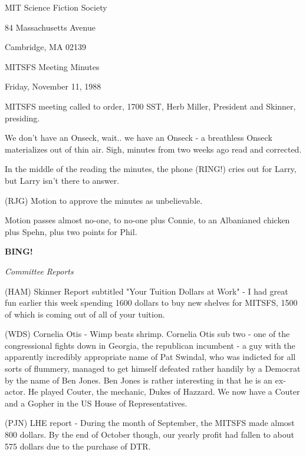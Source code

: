 \documentclass[12pt]{article}
\newcommand{\bing}{{\bf BING!} }
\newcommand{\goto}[1]{\bing \vskip 12pt \centerline{{\em{#1}}}}
\begin{document}
\begin{center}

MIT Science Fiction Society 

84 Massachusetts Avenue

Cambridge, MA 02139

\vspace{12pt}

MITSFS Meeting Minutes 

Friday, November 11, 1988

\end{center}
 
\vspace{18pt}

\setlength{\parskip}{6pt}

\noindent
MITSFS meeting called to order, 1700 SST, Herb Miller, President and Skinner, presiding.

We don't have an Onseck, wait.. we have an Onseck - a breathless Onseck materializes out of thin air. Sigh, minutes from two weeks ago read and corrected.

In the middle of the reading the minutes, the phone (RING!) cries out for Larry, but Larry isn't there to answer.

(RJG) Motion to approve the minutes as unbelievable.

Motion passes almost no-one, to no-one plus Connie, to an Albanianed chicken plus Spehn, plus two points for Phil.

\goto{Committee Reports}

(HAM) Skinner Report subtitled "Your Tuition Dollars at Work" - I had great fun earlier this week spending 1600 dollars to buy new shelves for MITSFS, 1500 of which is coming out of all of your tuition.

(WDS) Cornelia Otis - Wimp beats shrimp. Cornelia Otis sub two - one of the congressional fights down in Georgia, the republican incumbent - a guy with the apparently incredibly appropriate name of Pat Swindal, who was indicted for all sorts of flummery, managed to get himself defeated rather handily by a Democrat by the name of Ben Jones. Ben Jones is rather interesting in that he is an ex-actor. He played Couter, the mechanic, Dukes of Hazzard. We now have a Couter and a Gopher in the US House of Representatives.

(PJN) LHE report - During the month of September, the MITSFS made almost 800 dollars. By the end of October though, our yearly profit had fallen to about 575 dollars due to the purchase of DTR.
\end{document}
